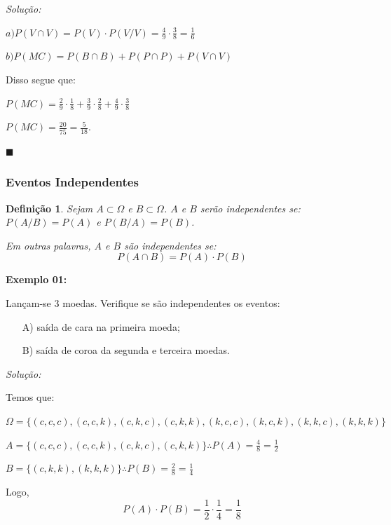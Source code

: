 \documentclass[oneside,a4paper,12pt]{article}
\newtheorem{definition}{Definição}[section]
\begin{document}
{\it Solução:}

$a) P(V \cap V) = P(V) \cdot P(V/V) = \displaystyle \frac{4}{9} \cdot \displaystyle \frac{3}{8} = \displaystyle \frac{1}{6}$

$b) P(MC) = P(B\cap B) + P(P \cap P) + P(V \cap V)$

Disso segue que:

$P(MC) = \displaystyle \frac{2}{9} \cdot \displaystyle \frac{1}{8} + \displaystyle \frac{3}{9} \cdot \displaystyle \frac{2}{8} + \displaystyle \frac{4}{9} \cdot \displaystyle \frac{3}{8}$

$P(MC) = \displaystyle \frac{20}{75} = \displaystyle \frac{5}{18}$.

\begin{flushright}
	$\blacksquare$
\end{flushright}

\subsubsection{Eventos Independentes}

\begin{definition}
	Sejam $A \subset \Omega$ e $B \subset \Omega$. $A$ e $B$ serão independentes se: $P(A/B) = P(A)$ e $P(B/A) = P(B)$.
	
	Em outras palavras, $A$ e $B$ são independentes se:
	$$P(A \cap B) =P(A)\cdot P(B)$$
\end{definition}

{\bf Exemplo 01:}

Lançam-se $3$ moedas. Verifique se são independentes os eventos:
\begin{itemize}
	\item[A)] saída de cara na primeira moeda;
	\item[B)] saída de coroa da segunda e terceira moedas. 
\end{itemize}

{\it Solução:}

Temos que:

$\Omega = \{ (c,c,c), (c,c,k), (c,k,c), (c,k,k), (k,c,c), (k,c,k), (k,k,c), (k,k,k) \}$

$A = \{ (c,c,c), (c,c,k), (c,k,c), (c,k,k) \} \therefore P(A) = \displaystyle \frac{4}{8} = \displaystyle \frac{1}{2}$

$B = \{ (c,k,k), (k,k,k) \} \therefore P(B) = \displaystyle \frac{2}{8} = \displaystyle \frac{1}{4}$

Logo,
$$P(A)\cdot P(B) = \frac{1}{2}\cdot \frac{1}{4} = \frac{1}{8}$$
\end{document}
